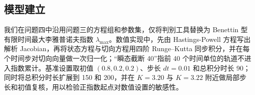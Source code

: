 \subsection{模型建立}
我们在问题四中沿用问题三的方程组和参数集，仅将判别工具替换为 Benettin 型有限时间最大李雅普诺夫指数 $\lambda_{\max}$。数值实现中，先由 Hastings-Powell 方程写出解析 Jacobian，再将状态方程与切向方程用四阶 Runge--Kutta 同步积分，并在每个时间步对切向向量做一次归一化；“瞬态截断 40”指前 40 个时间单位的轨道不进入指数累计。基准设置取初值 $(0.8,0.2,0.2)$、步长 $dt=0.01$ 和总积分时长 90；同时将总积分时长扩展到 150 和 200，并在 $K=3.20$ 与 $K=3.22$ 附近做局部步长和初值复核，用以检验正指数起点对数值设置的敏感性。

